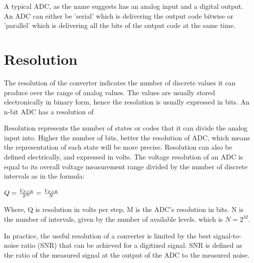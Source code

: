 \par
\hspace{0.5cm} A typical ADC, as the name suggests has an analog input and a digital output. An ADC can either be 'serial' which is delivering the output code bitwise or 'parallel' which is delivering all the bits of the output code at the same time. \\
 
 
\section{Resolution}

\par
\hspace{1.2cm} The resolution of the converter indicates the number of discrete values it can produce over the range of analog values. The values are usually stored electronically in binary form, hence the resolution is usually expressed in bits. An n-bit ADC has a resolution of \\

\par
\hspace{0.5cm}Resolution represents the number of states or codes that it can divide  the analog input into. Higher the number of bits, better the resolution of ADC, which means the representation of each state will be more precise. Resolution can also be defined electrically, and expressed in volts. The voltage resolution of an ADC is equal to its overall voltage measurement range divided by the number of discrete intervals as in the formula: \\

\begin{center}
$Q = {V_{FSR} \over {2^M}} = {V_{FSR} \over N}$
\end{center}

\hspace{0.5cm} Where, Q is resolution in volts per step, M is the ADC's resolution in bits. N is the number of intervals, given by the number of available levels. which is $N = 2^M$.\\

\par
\hspace{0.5cm} In practice, the useful resolution of a converter is limited by the best signal-to-noise ratio (SNR) that can be achieved for a digitized signal. SNR is defined as the ratio of the measured signal at the output of the ADC to the measured noise. \\

